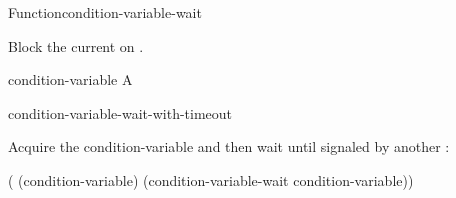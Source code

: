 \documentclass[10pt,twoside,english,pdftex]{article}
\begin{document}
\begin{functiondoc}{Function}{condition-variable-wait}%
  {}
%

\fnsyntax

\fnpurpose Block the current  on .

\fnpackage {}

\fnmodule {}

\fnargs
\begin{args}{condition-variable}
 A 
\end{args}

\fnerrors
\nocvlock{}
\par
\nothreads{}

\begin{alsos}{condition-variable-wait-with-timeout}
\end{alsos}

%
\fnexample Acquire the condition-variable  and then wait until
signaled by another :
\begin{example}
  ( (condition-variable)
    (condition-variable-wait condition-variable))
\end{example}

\end{functiondoc}

\end{document}
